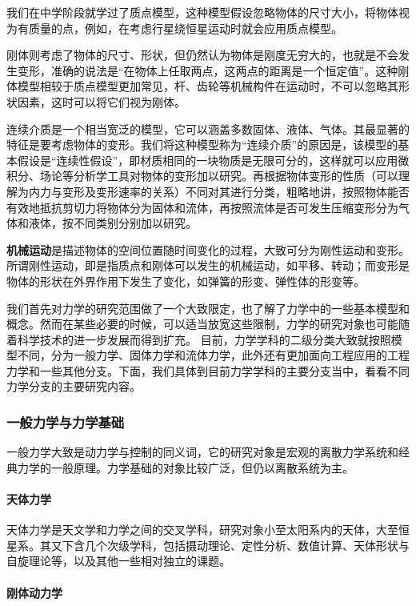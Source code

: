 我们在中学阶段就学过了质点模型，这种模型假设忽略物体的尺寸大小，将物体视为有质量的点，例如，在考虑行星绕恒星运动时就会应用质点模型。

刚体则考虑了物体的尺寸、形状，但仍然认为物体是刚度无穷大的，也就是不会发生变形，准确的说法是“在物体上任取两点，这两点的距离是一个恒定值”。这种刚体模型相较于质点模型更加常见，杆、齿轮等机械构件在运动时，不可以忽略其形状因素，这时可以将它们视为刚体。

连续介质是一个相当宽泛的模型，它可以涵盖多数固体、液体、气体。其最显著的特征是要考虑物体的变形。我们将这种模型称为“连续介质”的原因是，该模型的基本假设是“连续性假设”，即材质相同的一块物质是无限可分的，这样就可以应用微积分、场论等分析学工具对物体的变形加以研究。再根据物体变形的性质（可以理解为内力与变形及变形速率的关系）不同对其进行分类，粗略地讲，按照物体能否有效地抵抗剪切力将物体分为固体和流体，再按照流体是否可发生压缩变形分为气体和液体，按不同类别分别加以研究。

\textbf{机械运动}是描述物体的空间位置随时间变化的过程，大致可分为刚性运动和变形。所谓刚性运动，即是指质点和刚体可以发生的机械运动，如平移、转动；而变形是物体的形状在外界作用下发生了变化，如弹簧的形变、弹性体的形变等。

我们首先对力学的研究范围做了一个大致限定，也了解了力学中的一些基本模型和概念。然而在某些必要的时候，可以适当放宽这些限制，力学的研究对象也可能随着科学技术的进一步发展而得到扩充。
目前，力学学科的二级分类大致就按照模型不同，分为一般力学、固体力学和流体力学，此外还有更加面向工程应用的工程力学和一些其他分支。下面，我们具体到目前力学学科的主要分支当中，看看不同力学分支的主要研究内容。

\subsubsection{一般力学与力学基础}

一般力学大致是动力学与控制的同义词，它的研究对象是宏观的离散力学系统和经典力学的一般原理。力学基础的对象比较广泛，但仍以离散系统为主。

\paragraph{天体力学}

天体力学是天文学和力学之间的交叉学科，研究对象小至太阳系内的天体，大至恒星系。其又下含几个次级学科，包括摄动理论、定性分析、数值计算、天体形状与自旋理论等，以及其他一些相对独立的课题。

\paragraph{刚体动力学}

